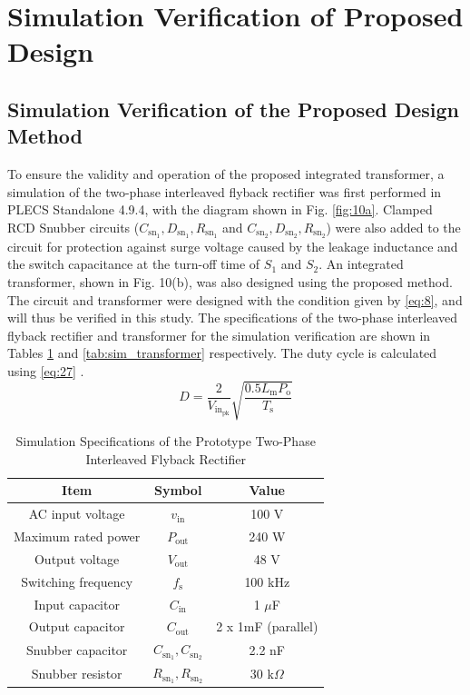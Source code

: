 \documentclass[lettersize,journal]{IEEEtran}
\begin{document}
\section{Simulation Verification of Proposed Design}

\subsection{Simulation Verification of the Proposed Design Method}
To ensure the validity and operation of the proposed integrated transformer, a simulation of the two-phase interleaved flyback rectifier was first performed in PLECS Standalone 4.9.4, with the diagram shown in Fig. \ref{fig:10a}. Clamped RCD Snubber circuits ($C_{\mathrm{sn}_1}, D_{\mathrm{sn}_1}, R_{\mathrm{sn}_1}$ and $C_{\mathrm{sn}_2}, D_{\mathrm{sn}_2}, R_{\mathrm{sn}_2}$) were also added to the circuit for protection against surge voltage \cite{ref15, ref16} caused by the leakage inductance and the switch capacitance at the turn-off time of $S_1$ and $S_2$. An integrated transformer, shown in Fig. 10(b), was also designed using the proposed method. The circuit and transformer were designed with the condition given by \eqref{eq:8}, and will thus be verified in this study. The specifications of the two-phase interleaved flyback rectifier and transformer for the simulation verification are shown in Tables \ref{tab:sim_rectifier} and \ref{tab:sim_transformer} respectively. The duty cycle is calculated using \eqref{eq:27} \cite{ref8}.
\begin{equation}
\label{eq:27}
D = \frac{2}{V_{\mathrm{in}_{\mathrm{pk}}}} \sqrt{\frac{0.5 L_{\mathrm{m}} P_{\mathrm{o}}}{T_{\mathrm{s}}}}
\end{equation}

\begin{table}[htbp]
    \caption{Simulation Specifications of the Prototype Two-Phase Interleaved Flyback Rectifier}
    \centering
    \footnotesize
    \setlength{\tabcolsep}{3pt} %
    \begin{tabular}{ccc}
        \hline
        \textbf{Item} & \textbf{Symbol} & \textbf{Value} \\
        \hline \hline
        AC input voltage & $v_{\mathrm{in}}$ & 100 V \\
        Maximum rated power & $P_{\mathrm{out}}$ & 240 W \\
        Output voltage & $V_{\mathrm{out}}$ & 48 V \\
        Switching frequency & $f_{\mathrm{s}}$ & 100 kHz \\
        Input capacitor & $C_{\mathrm{in}}$ & 1 $\mu$F \\
        Output capacitor & $C_{\mathrm{out}}$ & 2 x 1mF (parallel) \\
        Snubber capacitor & $C_{\mathrm{sn}_1}, C_{\mathrm{sn}_2}$ & 2.2 nF \\
        Snubber resistor & $R_{\mathrm{sn}_1}, R_{\mathrm{sn}_2}$ & 30 k$\Omega$ \\
        \hline
    \end{tabular}
    \label{tab:sim_rectifier}
\end{table}
\end{document}
